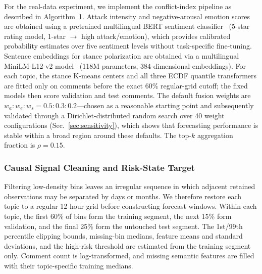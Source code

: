 \documentclass[journal]{IEEEtran}
\begin{document}
For the real-data experiment, we implement the conflict-index pipeline as described in Algorithm~1. Attack intensity and negative-arousal emotion scores are obtained using a pretrained multilingual BERT sentiment classifier~\cite{bert-multilingual-sentiment} (5-star rating model, 1-star $\rightarrow$ high attack/emotion), which provides calibrated probability estimates over five sentiment levels without task-specific fine-tuning. Sentence embeddings for stance polarization are obtained via a multilingual MiniLM-L12-v2 model~\cite{wang2020minilm} (118M parameters, 384-dimensional embeddings). For each topic, the stance K-means centers and all three ECDF quantile transformers are fitted only on comments before the exact 60\% regular-grid cutoff; the fixed models then score validation and test comments. The default fusion weights are $w_a:w_e:w_s = 0.5:0.3:0.2$---chosen as a reasonable starting point and subsequently validated through a Dirichlet-distributed random search over 40 weight configurations (Sec.~\ref{sec:sensitivity}), which shows that forecasting performance is stable within a broad region around these defaults. The top-$k$ aggregation fraction is $\rho=0.15$.

\subsubsection{Causal Signal Cleaning and Risk-State Target}

Filtering low-density bins leaves an irregular sequence in which adjacent retained observations may be separated by days or months. We therefore restore each topic to a regular 12-hour grid before constructing forecast windows. Within each topic, the first 60\% of bins form the training segment, the next 15\% form validation, and the final 25\% form the untouched test segment. The 1st/99th percentile clipping bounds, missing-bin medians, feature means and standard deviations, and the high-risk threshold are estimated from the training segment only. Comment count is log-transformed, and missing semantic features are filled with their topic-specific training medians.
\end{document}
